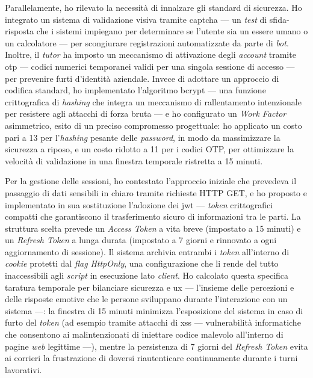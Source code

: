 Parallelamente, ho rilevato la necessità di innalzare gli standard di sicurezza. Ho integrato un sistema di validazione visiva tramite \gls{captcha} --- un \textit{test} di sfida-risposta che i sistemi impiegano per determinare se l'utente sia un essere umano o un calcolatore --- per scongiurare registrazioni automatizzate da parte di \textit{bot}. Inoltre, il \textit{tutor} ha imposto un meccanismo di attivazione degli \textit{account} tramite \gls{otp} --- codici numerici temporanei validi per una singola sessione di accesso --- per prevenire furti d'identità aziendale. Invece di adottare un approccio di codifica standard, ho implementato l'algoritmo \gls{bcrypt} --- una funzione crittografica di \textit{hashing} che integra un meccanismo di rallentamento intenzionale per resistere agli attacchi di forza bruta --- e ho configurato un \textit{Work Factor} asimmetrico, esito di un preciso compromesso progettuale: ho applicato un costo pari a 13 per l'\textit{hashing} pesante delle \textit{password}, in modo da massimizzare la sicurezza a riposo, e un costo ridotto a 11 per i codici OTP, per ottimizzare la velocità di validazione in una finestra temporale ristretta a 15 minuti.

Per la gestione delle sessioni, ho contestato l'approccio iniziale che prevedeva il passaggio di dati sensibili in chiaro tramite richieste HTTP GET, e ho proposto e implementato in sua sostituzione l'adozione dei \gls{jwt} --- \textit{token} crittografici compatti che garantiscono il trasferimento sicuro di informazioni tra le parti. La struttura scelta prevede un \textit{Access Token} a vita breve (impostato a 15 minuti) e un \textit{Refresh Token} a lunga durata (impostato a 7 giorni e rinnovato a ogni aggiornamento di sessione). Il sistema archivia entrambi i \textit{token} all'interno di \textit{cookie} protetti dal \textit{flag} \textit{HttpOnly}, una configurazione che li rende del tutto inaccessibili agli \textit{script} in esecuzione lato \textit{client}. Ho calcolato questa specifica taratura temporale per bilanciare sicurezza e \gls{ux} --- l'insieme delle percezioni e delle risposte emotive che le persone sviluppano durante l'interazione con un sistema ---: la finestra di 15 minuti minimizza l'esposizione del sistema in caso di furto del \textit{token} (ad esempio tramite attacchi di \gls{xss} --- vulnerabilità informatiche che consentono ai malintenzionati di iniettare codice malevolo all'interno di pagine \textit{web} legittime ---), mentre la persistenza di 7 giorni del \textit{Refresh Token} evita ai corrieri la frustrazione di doversi riautenticare continuamente durante i turni lavorativi.

